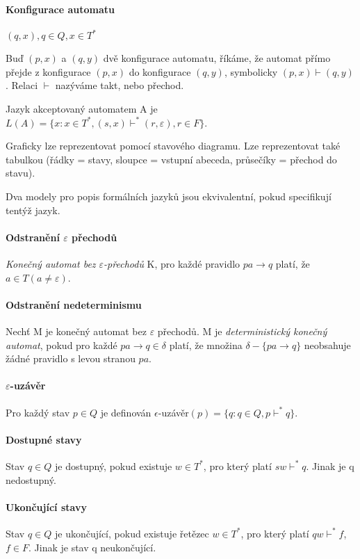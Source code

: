 \documentclass[a4paper, 11pt]{report}
\begin{document}
\paragraph{Konfigurace automatu}
 $(q,x), q \in Q, x \in T^*$

Buď $(p,x)$ a $(q,y)$ dvě konfigurace automatu, říkáme, že automat přímo přejde z konfigurace $(p,x)$ do konfigurace $(q,y)$, symbolicky $(p,x) \vdash (q,y)$. Relaci $\vdash$ nazýváme takt, nebo přechod.

Jazyk akceptovaný automatem A je $L(A) = \{x: x \in T^*, (s,x) \vdash^* (r, \varepsilon), r \in F\}$.

Graficky lze reprezentovat pomocí stavového diagramu. Lze reprezentovat také tabulkou (řádky = stavy, sloupce = vstupní abeceda, průsečíky = přechod do stavu).

Dva modely pro popis formálních jazyků jsou ekvivalentní, pokud specifikují tentýž jazyk.

\paragraph{Odstranění $\varepsilon$ přechodů}
\emph{Konečný automat bez $\varepsilon$-přechodů} K, pro každé pravidlo $pa \to q$ platí, že $a \in T (a \neq \varepsilon)$.

\paragraph{Odstranění nedeterminismu}
Nechť M je konečný automat bez $\varepsilon$ přechodů. M je \emph{deterministický konečný automat}, pokud pro každé $pa \to q \in \delta$ platí, že množina $\delta - \{pa \to q\}$ neobsahuje žádné pravidlo s levou stranou $pa$.

\paragraph{$\varepsilon$-uzávěr}
Pro každý stav $p \in Q$ je definován $\epsilon$-uzávěr$(p) = \{ q: q \in Q, p \vdash^* q\}$.

\paragraph{Dostupné stavy}
Stav $q \in Q$ je dostupný, pokud existuje $w \in T^*$, pro který platí $sw \vdash^* q$. Jinak je q nedostupný.

\paragraph{Ukončující stavy}
Stav $q \in Q$ je ukončující, pokud existuje řetězec $w \in T^*$, pro který platí $qw \vdash^* f$, $f \in F$. Jinak je stav q neukončující. 
\end{document}
